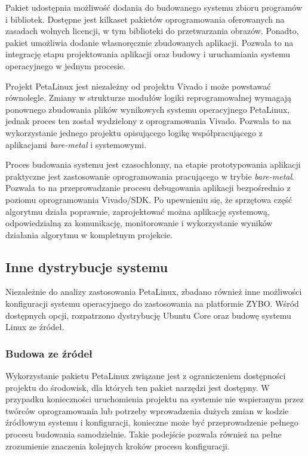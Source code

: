 Pakiet udostępnia możliwość dodania do budowanego systemu zbioru programów i bibliotek. 
Dostępne jest kilkaset pakietów oprogramowania oferowanych na zasadach wolnych licencji, w tym biblioteki do przetwarzania obrazów. %
Ponadto, pakiet umożliwia dodanie własnoręcznie zbudowanych aplikacji. 
Pozwala to na integrację etapu projektowania aplikacji oraz budowy i uruchamiania systemu operacyjnego w jednym procesie.

Projekt PetaLinux jest niezależny od projektu Vivado i może powstawać równolegle. 
Zmiany w strukturze modułów logiki reprogramowalnej wymagają ponownego zbudowania plików wynikowych systemu operacyjnego PetaLinux, jednak proces ten został wydzielony z oprogramowania Vivado. %
Pozwala to na wykorzystanie jednego projektu opisującego logikę współpracującego z aplikacjami \textit{bare-metal} i systemowymi. 

Proces budowania systemu jest czasochłonny, na etapie prototypowania aplikacji praktyczne jest zastosowanie oprogramowania pracującego w trybie \textit{bare-metal}. %
Pozwala to na przeprowadzanie procesu debugowania aplikacji bezpośrednio z poziomu oprogramowania Vivado/SDK. 
Po upewnieniu się, że sprzętowa część algorytmu działa poprawnie, zaprojektować można aplikację systemową, odpowiedzialną za komunikację, monitorowanie i wykorzystanie wyników działania algorytmu w kompletnym projekcie.

\subsection{Inne dystrybucje systemu}
Niezależnie do analizy zastosowania PetaLinux, zbadano również inne możliwości konfiguracji systemu operacyjnego do zastosowania na platformie ZYBO. 
Wśród dostępnych opcji, rozpatrzono dystrybucję Ubuntu Core oraz budowę systemu Linux ze źródeł.

\subsubsection{Budowa ze źródeł}
Wykorzystanie pakietu PetaLinux związane jest z ograniczeniem dostępności projektu do środowisk, dla których ten pakiet narzędzi jest dostępny. 
W przypadku konieczności uruchomienia projektu na systemie nie wspieranym przez twórców oprogramowania lub potrzeby wprowadzenia dużych zmian w kodzie źródłowym systemu i konfiguracji, konieczne może być przeprowadzenie pełnego procesu budowania samodzielnie. 
Takie podejście pozwala również na pełne zrozumienie znaczenia kolejnych kroków procesu konfiguracji.

